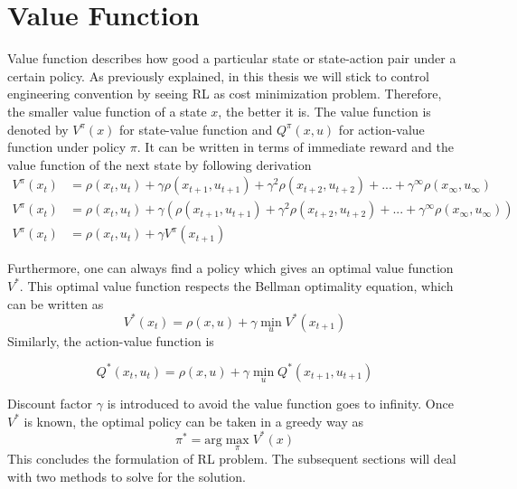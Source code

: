 \section{Value Function} \label{sec:value}
Value function describes how good a particular state or state-action pair under a certain policy. As previously explained, in this thesis we will stick to control engineering convention by seeing \ac{RL} as cost minimization problem. Therefore, the smaller value function of a state $x$, the better it is. The value function is denoted by $ V^{\pi}(x) $ for state-value function and $ Q^{\pi}(x,u) $ for action-value function under policy $\pi$. It can be written in terms of immediate reward and the value function of the next state by following derivation
\begin{equation}
\begin{split}
V^{\pi}(x_t) &= \rho(x_t,u_t) + \gamma \rho(x_{t+1},u_{t+1}) + \gamma^2 \rho(x_{t+2},u_{t+2}) + ... + \gamma^{\infty}\rho(x_{\infty},u_{\infty}) \\
V^{\pi}(x_t) &= \rho(x_t,u_t) + \gamma \left( \rho(x_{t+1},u_{t+1}) + \gamma^2 \rho(x_{t+2},u_{t+2}) + ... + \gamma^{\infty}\rho(x_{\infty},u_{\infty})\right)  \\
V^{\pi}(x_t) &= \rho(x_t,u_t) + \gamma V^{\pi}(x_{t+1})
\end{split}
\end{equation} 

Furthermore, one can always find a policy which gives an optimal value function $V^*$. This optimal value function respects the Bellman optimality equation, which can be written as 
\begin{equation}
V^*(x_t) = \rho(x,u) + \gamma \min_{u} V^*(x_{t+1})
\label{eq:bellman}
\end{equation}
Similarly, the action-value function is

\begin{equation}
Q^*(x_t,u_t) = \rho(x,u) + \gamma \min_{u} Q^*(x_{t+1},u_{t+1})
\label{eq:bellman2}
\end{equation}

Discount factor $\gamma$ is introduced to avoid the value function goes to infinity. Once $V^*$ is known, the optimal policy can be taken in a greedy way as
\begin{equation}
\pi^* = \text{arg} \max_{\pi} V^*(x)
\label{eq:optPi}
\end{equation}
This concludes the formulation of \ac{RL} problem. The subsequent sections will deal with two methods to solve for the solution.

